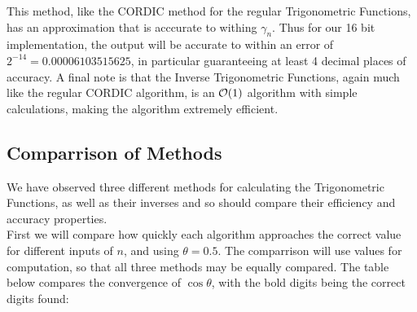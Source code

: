 {This method, like the CORDIC method for the regular Trigonometric Functions, has an approximation that is acccurate to withing \(\gamma_n\). Thus for our 16 bit implementation, the output will be accurate to within an error of \(2^{-14} = 0.00006103515625\), in particular guaranteeing at least 4 decimal places of accuracy. A final note is that the Inverse Trigonometric Functions, again much like the regular CORDIC algorithm, is an \(\mathcal{O}(1)\) algorithm with simple calculations, making the algorithm extremely efficient.

\subsection{Comparrison of Methods}

We have observed three different methods for calculating the Trigonometric Functions, as well as their inverses and so should compare their efficiency and accuracy properties.\\

First we will compare how quickly each algorithm approaches the correct value for different inputs of \(n\), and using \(\theta = 0.5\). The comparrison will use  values for computation, so that all three methods may be equally compared. The table below compares the convergence of \(\cos\theta\), with the bold digits being the correct digits found:

}
